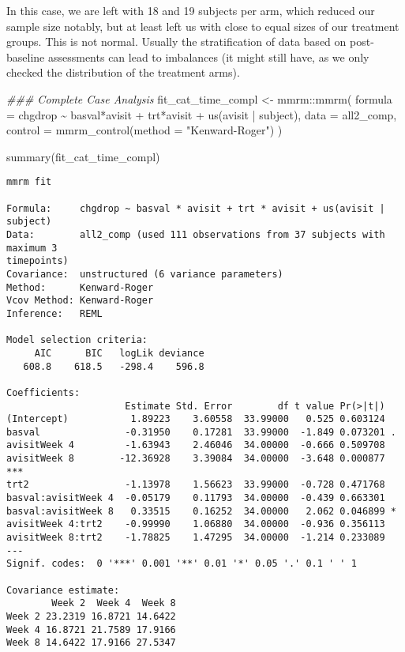 \documentclass[
  letterpaper,
  DIV=11,
  numbers=noendperiod]{scrreprt}
\newenvironment{Shaded}{\begin{snugshade}}{\end{snugshade}}
\newcommand{\AttributeTok}[1]{\textcolor[rgb]{0.40,0.45,0.13}{#1}}
\newcommand{\DocumentationTok}[1]{\textcolor[rgb]{0.37,0.37,0.37}{\textit{#1}}}
\newcommand{\FunctionTok}[1]{\textcolor[rgb]{0.28,0.35,0.67}{#1}}
\newcommand{\NormalTok}[1]{\textcolor[rgb]{0.00,0.23,0.31}{#1}}
\newcommand{\OtherTok}[1]{\textcolor[rgb]{0.00,0.23,0.31}{#1}}
\newcommand{\SpecialCharTok}[1]{\textcolor[rgb]{0.37,0.37,0.37}{#1}}
\newcommand{\StringTok}[1]{\textcolor[rgb]{0.13,0.47,0.30}{#1}}
\begin{document}
In this case, we are left with 18 and 19 subjects per arm, which reduced
our sample size notably, but at least left us with close to equal sizes
of our treatment groups. This is not normal. Usually the stratification
of data based on post-baseline assessments can lead to imbalances (it
might still have, as we only checked the distribution of the treatment
arms).

\begin{Shaded}
\begin{Highlighting}[]
\DocumentationTok{\#\#\# Complete Case Analysis}
\NormalTok{fit\_cat\_time\_compl }\OtherTok{\textless{}{-}}\NormalTok{ mmrm}\SpecialCharTok{::}\FunctionTok{mmrm}\NormalTok{(}
  \AttributeTok{formula =}\NormalTok{ chgdrop }\SpecialCharTok{\textasciitilde{}}\NormalTok{ basval}\SpecialCharTok{*}\NormalTok{avisit }\SpecialCharTok{+}\NormalTok{ trt}\SpecialCharTok{*}\NormalTok{avisit }\SpecialCharTok{+} \FunctionTok{us}\NormalTok{(avisit }\SpecialCharTok{|}\NormalTok{ subject),}
  \AttributeTok{data =}\NormalTok{ all2\_comp,}
  \AttributeTok{control =} \FunctionTok{mmrm\_control}\NormalTok{(}\AttributeTok{method =} \StringTok{"Kenward{-}Roger"}\NormalTok{)}
\NormalTok{)}

\FunctionTok{summary}\NormalTok{(fit\_cat\_time\_compl)}
\end{Highlighting}
\end{Shaded}

\begin{verbatim}
mmrm fit

Formula:     chgdrop ~ basval * avisit + trt * avisit + us(avisit | subject)
Data:        all2_comp (used 111 observations from 37 subjects with maximum 3 
timepoints)
Covariance:  unstructured (6 variance parameters)
Method:      Kenward-Roger
Vcov Method: Kenward-Roger
Inference:   REML

Model selection criteria:
     AIC      BIC   logLik deviance 
   608.8    618.5   -298.4    596.8 

Coefficients: 
                     Estimate Std. Error        df t value Pr(>|t|)    
(Intercept)           1.89223    3.60558  33.99000   0.525 0.603124    
basval               -0.31950    0.17281  33.99000  -1.849 0.073201 .  
avisitWeek 4         -1.63943    2.46046  34.00000  -0.666 0.509708    
avisitWeek 8        -12.36928    3.39084  34.00000  -3.648 0.000877 ***
trt2                 -1.13978    1.56623  33.99000  -0.728 0.471768    
basval:avisitWeek 4  -0.05179    0.11793  34.00000  -0.439 0.663301    
basval:avisitWeek 8   0.33515    0.16252  34.00000   2.062 0.046899 *  
avisitWeek 4:trt2    -0.99990    1.06880  34.00000  -0.936 0.356113    
avisitWeek 8:trt2    -1.78825    1.47295  34.00000  -1.214 0.233089    
---
Signif. codes:  0 '***' 0.001 '**' 0.01 '*' 0.05 '.' 0.1 ' ' 1

Covariance estimate:
        Week 2  Week 4  Week 8
Week 2 23.2319 16.8721 14.6422
Week 4 16.8721 21.7589 17.9166
Week 8 14.6422 17.9166 27.5347
\end{verbatim}
\end{document}
